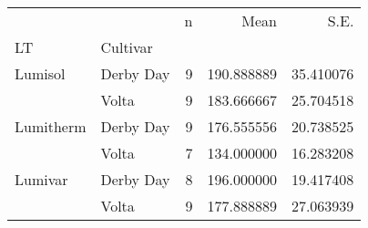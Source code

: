 \begin{tabular}{llrrr}
\toprule
        &       &  n &        Mean &       S.E. \\
LT & Cultivar &    &             &            \\
\midrule
Lumisol & Derby Day &  9 &  190.888889 &  35.410076 \\
        & Volta &  9 &  183.666667 &  25.704518 \\
Lumitherm & Derby Day &  9 &  176.555556 &  20.738525 \\
        & Volta &  7 &  134.000000 &  16.283208 \\
Lumivar & Derby Day &  8 &  196.000000 &  19.417408 \\
        & Volta &  9 &  177.888889 &  27.063939 \\
\bottomrule
\end{tabular}
